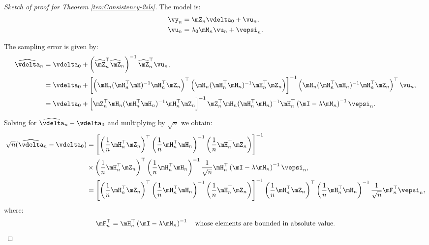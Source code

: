 \documentclass[english,12pt]{book}\usepackage[]{graphicx}\usepackage[]{xcolor}
\begin{document}
\begin{proof}[Sketch of proof for Theorem \ref{teo:Consistency-2sls}]
The model is:
\begin{equation*}
\begin{aligned}
	\vy_n & = \mZ_n\vdelta_0 + \vu_n,\\
	\vu_n & = \lambda_0 \mM_n \vu_n + \vepsi_n.
\end{aligned}
\end{equation*}


The sampling error is given by:
\begin{equation*}
  \begin{aligned}
     \widehat{\vdelta}_n & =  \vdelta_0 + \left(\widehat{\mZ}^\top_n\widehat{\mZ}_n\right)^{-1}\widehat{\mZ}^\top_n\vu_n, \\
     & = \vdelta_0 + \left[\left(\mH_n(\mH_n^\top\mH)^{-1}\mH_n^\top\mZ_n\right)^\top\left(\mH_n(\mH^\top_n\mH_n)^{-1}\mH^\top_n\mZ_n\right)\right]^{-1}\left(\mH_n(\mH_n^\top\mH_n)^{-1}\mH_n^\top\mZ_n\right)^\top\vu_n,\\
     & = \vdelta_0 + \left[\mZ^\top_n \mH_n (\mH^\top_n\mH_n)^{-1}\mH^\top_n\mZ_n\right]^{-1}\mZ^\top_n\mH_n(\mH^\top_n\mH_n)^{-1}\mH^\top_n\left(\mI -\lambda\mM_n\right)^{-1}\vepsi_n.
  \end{aligned}
\end{equation*}

Solving for $\widehat{\vdelta}_{n} - \vdelta_0$ and multiplying by $\sqrt{n}$ we obtain:
\begin{equation*}
\begin{aligned}
\sqrt{n}(\widehat{\vdelta}_{n} - \vdelta_0) & = \left[\left(\frac{1}{n}\mH^\top_n\mZ_n \right)^\top\left(\frac{1}{n}\mH^\top_n\mH_n\right)^{-1}\left(\frac{1}{n}\mH^\top_n\mZ_n \right)\right]^{-1} \\
& \times \left(\frac{1}{n}\mH^\top_n\mZ_n \right)^\top\left(\frac{1}{n}\mH^\top_n\mH_n\right)^{-1}\frac{1}{\sqrt{n}}\mH^\top_n\left(\mI -\lambda\mM_n\right)^{-1}\vepsi_n, \\
             & = \left[\left(\frac{1}{n}\mH^\top_n\mZ_n \right)^\top\left(\frac{1}{n}\mH^\top_n\mH_n\right)^{-1}\left(\frac{1}{n}\mH^\top_n\mZ_n \right)\right]^{-1}\left(\frac{1}{n}\mH^\top_n\mZ_n \right)^\top\left(\frac{1}{n}\mH^\top_n\mH_n\right)^{-1}\frac{1}{\sqrt{n}}\mF_n^\top\vepsi_n,
\end{aligned}
\end{equation*}
%
where:
\begin{equation*}
\mF_n^\top = \mH^\top_n\left(\mI -\lambda\mM_n\right)^{-1} \quad \mbox{whose elements are bounded in absolute value.}
\end{equation*}


\end{proof}
\end{document}
